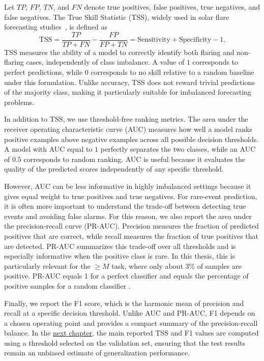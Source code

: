 Let $TP$, $FP$, $TN$, and $FN$ denote true positives, false positives, true negatives, and false negatives. The True Skill Statistic (TSS), widely used in solar flare forecasting studies~\cite{ref_bloomfield}, is defined as
\begin{equation}
\mathrm{TSS}
= \frac{TP}{TP + FN} - \frac{FP}{FP + TN}
= \mathrm{Sensitivity} + \mathrm{Specificity} - 1 .
\end{equation}
TSS measures the ability of a model to correctly identify both flaring and non-flaring cases, independently of class imbalance. A value of $1$ corresponds to perfect predictions, while $0$ corresponds to no skill relative to a random baseline under this formulation. Unlike accuracy, TSS does not reward trivial predictions of the majority class, making it particularly suitable for imbalanced forecasting problems.

In addition to TSS, we use threshold-free ranking metrics. The area under the receiver operating characteristic curve (AUC) measures how well a model ranks positive examples above negative examples across all possible decision thresholds. A model with AUC equal to $1$ perfectly separates the two classes, while an AUC of $0.5$ corresponds to random ranking. AUC is useful because it evaluates the quality of the predicted scores independently of any specific threshold.

However, AUC can be less informative in highly imbalanced settings because it gives equal weight to true positives and true negatives. For rare-event prediction, it is often more important to understand the trade-off between detecting true events and avoiding false alarms. For this reason, we also report the area under the precision-recall curve (PR-AUC). Precision measures the fraction of predicted positives that are correct, while recall measures the fraction of true positives that are detected. PR-AUC summarizes this trade-off over all thresholds and is especially informative when the positive class is rare. In this thesis, this is particularly relevant for the $\geq M$ task, where only about 3\% of samples are positive. PR-AUC  equals 1 for a perfect classifier and equals the percentage of positive samples for a random classifier \cite{saito2015precision}.

Finally, we report the F1 score, which is the harmonic mean of precision and recall at a specific decision threshold. Unlike AUC and PR-AUC, F1 depends on a chosen operating point and provides a compact summary of the precision-recall balance. In the \hyperref[chap:article1]{next chapter}, the main reported TSS and F1 values are computed using a threshold selected on the validation set, ensuring that the test results remain an unbiased estimate of generalization performance.

